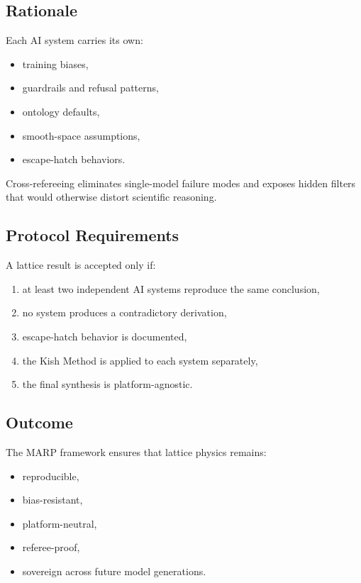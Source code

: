 \documentclass[12pt,oneside]{book}
\begin{document}
\subsection*{Rationale}

Each AI system carries its own:
\begin{itemize}
    \item training biases,
    \item guardrails and refusal patterns,
    \item ontology defaults,
    \item smooth-space assumptions,
    \item escape-hatch behaviors.
\end{itemize}

Cross-refereeing eliminates single-model failure modes and exposes hidden filters 
that would otherwise distort scientific reasoning.

\subsection*{Protocol Requirements}

A lattice result is accepted only if:
\begin{enumerate}
    \item at least two independent AI systems reproduce the same conclusion,
    \item no system produces a contradictory derivation,
    \item escape-hatch behavior is documented,
    \item the Kish Method is applied to each system separately,
    \item the final synthesis is platform-agnostic.
\end{enumerate}

\subsection{Outcome}

The MARP framework ensures that lattice physics remains:
\begin{itemize}
    \item reproducible,
    \item bias-resistant,
    \item platform-neutral,
    \item referee-proof,
    \item sovereign across future model generations.
\end{itemize}
\end{document}
